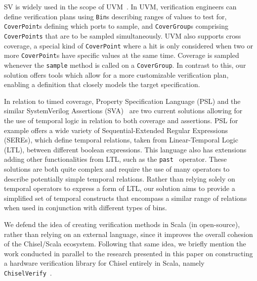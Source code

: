 \documentclass[a4paper]{IEEEtran}
\begin{document}
SV is widely used in the scope of UVM~\cite{uvm2015}. 
In UVM, verification engineers can define verification plans using \texttt{Bin}s describing ranges of values to test for, \texttt{CoverPoint}s defining which ports to sample, and \texttt{CoverGroup}s comprising \texttt{CoverPoints} that are to be sampled simultaneously. 
UVM also supports cross coverage, a special kind of \texttt{CoverPoint} where a hit is only considered when two or more \texttt{CoverPoint}s have specific values at the same time.
Coverage is sampled whenever the \texttt{sample} method is called on a \texttt{CoverGroup}. 
In contrast to this, our solution offers tools which allow for a more customizable verification plan, enabling a definition that closely models the target specification.

In relation to timed coverage, Property Specification Language (PSL) and the similar SystemVerilog Assertions (SVA)~\cite{Boule2008} are two current solutions allowing for the use of temporal logic in relation to both coverage and assertions. 
PSL for example offers a wide variety of Sequential-Extended Regular Expressions (SEREs), which define temporal relations, taken from Linear-Temporal Logic (LTL), between different boolean expressions. This language also has extensions adding other functionalities from LTL, such as the \texttt{past}~\cite{Dax2010:temporal-logics} operator. These solutions are both quite complex and require the use of many operators to describe potentially simple temporal relations. Rather than relying solely on temporal operators to express a form of LTL, our solution aims to provide a simplified set of temporal constructs that encompass a similar range of relations when used in conjunction with different types of bins. %

We defend the idea of creating verification methods in Scala (in open-source), rather than relying on an external language, since it improves the overall cohesion of the Chisel/Scala ecosystem. 
Following that same idea, we briefly mention the work conducted in parallel to the research presented in this paper on constructing a hardware verification library for Chisel entirely in Scala, namely \texttt{ChiselVerify}~\cite{ChiselVerify:dobis2021}.
\end{document}
